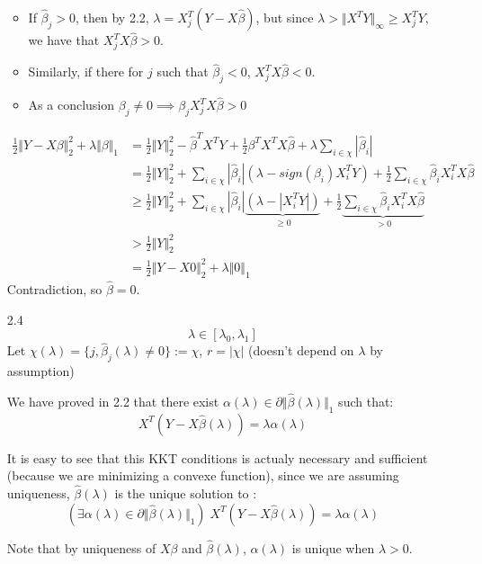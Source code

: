 \documentclass[12pt]{article}
\newcommand{\norm}[1]{\Vert #1 \Vert}
\begin{document}
\begin{itemize}
  \begin{itemize}
  \item If $\hat \beta_j > 0$, then by 2.2,   $\lambda = X_j^T (Y - X \hat \beta)$, but since  $\lambda > \norm{X^TY}_{\infty} \ge X_j^TY$, we have that  $X_j^TX\hat \beta > 0$.
  \item   Similarly, if there for $j$ such that $\hat \beta_j < 0$,  $X_j^TX\hat \beta < 0$.
  \item  As a conclusion $\beta_j \ne 0 \implies \beta_j X_j^TX\hat \beta > 0$
  \end{itemize}
  
  \begin{align*}
    \frac12 \norm{Y - X\beta}_2^2 + \lambda \norm{\beta}_1
    &= \frac12 \norm{Y}_2^2 - \hat \beta^TX^TY + \frac12 \beta^T X^TX \hat \beta +  \lambda \sum_{i \in \chi} |\hat \beta_i|
    \\&=\frac12 \norm{Y}_2^2 +
        \sum_{i \in \chi} |\hat \beta_i| (\lambda - sign(\beta_i) X_i^TY)
        + \frac12  \sum_{i \in \chi} \hat\beta_i X_i^TX\hat \beta
    \\&\ge \frac12 \norm{Y}_2^2 +
        \sum_{i \in \chi} |\hat \beta_i| \underbrace{(\lambda - |X_i^TY|)}_{\ge 0}
        + \frac12  \underbrace{\sum_{i \in \chi} \hat\beta_i X_i^TX\hat \beta}_{> 0}
    \\&> \frac12 \norm{Y}_2^2
    \\&= \frac12 \norm{Y - X0}_2^2 + \lambda\norm{0}_1
  \end{align*}
  Contradiction, so $\hat \beta = 0$.
\item[2.4]
  $$\lambda \in [\lambda_0, \lambda_1]$$
  Let $\chi(\lambda) = \{ j, \hat \beta_j(\lambda) \ne 0 \} := \chi$, $r = |\chi|$ (doesn't depend on $\lambda$ by assumption)

  We have proved in 2.2 that there exist  $\alpha(\lambda) \in \partial \norm{\hat \beta(\lambda)}_1$ such that:
  $$X^T(Y - X\hat \beta(\lambda)) = \lambda \alpha(\lambda) $$


  It is easy to see that this KKT conditions is actualy necessary and sufficient (because we are minimizing a convexe function), since we are assuming uniqueness, $\hat \beta(\lambda)$ is the unique solution to :
  $$(\exists \alpha(\lambda) \in \partial \norm{\hat \beta(\lambda)}_1) \; X^T(Y - X\hat \beta(\lambda)) = \lambda \alpha(\lambda) $$
  
  Note that by uniqueness of $X\beta$ and $\hat \beta(\lambda)$, $\alpha(\lambda)$ is unique when $\lambda > 0$.
  

\end{itemize}
\end{document}
